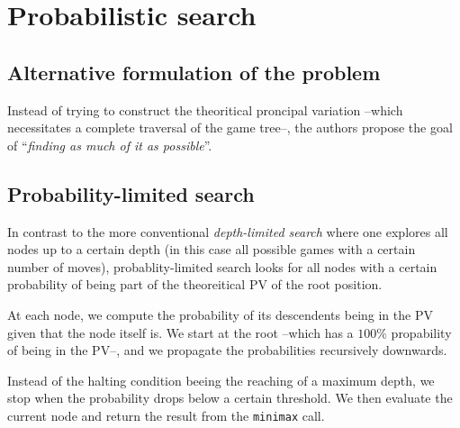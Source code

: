 \section{Probabilistic search}
		\subsection{Alternative formulation of the problem}
	
			Instead of trying to construct the theoritical proncipal variation --which necessitates a complete traversal of the game tree--, the authors propose the goal of ``\emph{finding as much of it as possible}''.

		\subsection{Probability-limited search}

			In contrast to the more conventional \emph{depth-limited search} where one explores all nodes up to a certain depth (in this case all possible games with a certain number of moves), probablity-limited search looks for all nodes with a certain probability of being part of the theoreitical PV of the root position.
		
			At each node, we compute the probability of its descendents being in the PV given that the node itself is. We start at the root --which has a \(100\%\) propability of being in the PV--, and we propagate the probabilities recursively downwards.
		
			Instead of the halting condition beeing the reaching of a maximum depth, we stop when the probability drops below a certain threshold. We then evaluate the current node and return the result from the \verb|minimax| call.
